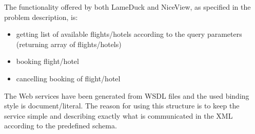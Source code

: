 The functionality offered by both LameDuck and NiceView, as specified in the problem description, is:
\begin{itemize}
\item getting list of available flights/hotels according to the query parameters (returning array of flights/hotels) 
\item booking flight/hotel
\item cancelling booking of flight/hotel
\end{itemize}

The Web services have been generated from WSDL files and the used binding style is document/literal. The reason for using this structure is to keep the service simple and describing exactly what is communicated in the XML according to the predefined schema.
